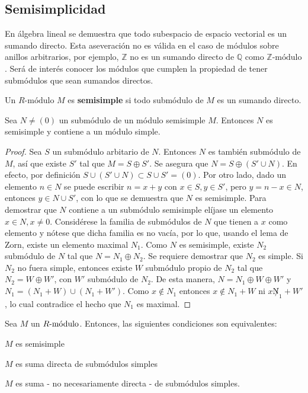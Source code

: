 \subsection{Semisimplicidad}
En álgebra lineal se demuestra que todo subespacio de espacio vectorial es un sumando directo. Esta aseveración no es válida en el caso de módulos sobre anillos arbitrarios, por ejemplo, $\mathds{Z}$ no es un sumando directo de $\mathds{Q}$ como $\mathds{Z}\mbox{-módulo}$. Será de interés conocer los módulos que cumplen la propiedad de tener submódulos que sean sumandos directos. 
\begin{definicion}
Un $R\mbox{-módulo}$ $M$ es \textbf{semisimple} si todo submódulo de $M$ es un sumando directo. 
\end{definicion}  
\begin{proposicion}
Sea $N \neq (0)$ un submódulo de un módulo semisimple $M$. Entonces $N$ es semisimple y contiene a un módulo simple.
\end{proposicion}
\begin{proof}
Sea $S$ un submódulo arbitario de $N$. Entonces $N$ es también submódulo de $M$, así que existe $S'$ tal que $M = S \oplus S'$. Se asegura que $N = S \oplus (S'\cup N)$. En efecto, por definición $S \cup (S'\cup N) \subset S\cup S' = (0)$. Por otro lado, dado un elemento $n \in N$ se puede escribir $n = x + y$ con $x \in S, y \in S'$, pero $y = n - x \in N$, entonces $y \in N \cup S'$, con lo que se demuestra que $N$ es semisimple. 
Para demostrar que $N$ contiene a un submódulo semisimple elíjase un elemento $x \in N, x \neq 0$. Considérese la familia de submódulos de $N$ que tienen a $x$ como elemento y nótese que dicha familia es no vacía, por lo que, usando el lema de Zorn, existe un elemento maximal $N_1$. Como $N$ es semisimple, existe $N_2$ submódulo de $N$ tal que $N = N_1 \oplus N_2$. Se requiere demostrar que $N_2$ es simple.
Si $N_2$ no fuera simple, entonces existe $W$ submódulo propio de $N_2$ tal que $N_2 = W \oplus W'$, con $W'$ submódulo de $N_2$. De esta manera, $N = N_1 \oplus W \oplus W'$ y $N_1 = (N_1 + W)\cup(N_1 + W')$. Como $x \notin N_1$ entonces $x \notin N_1 + W$ ni $x \not N_1 + W'$, lo cual contradice el hecho que $N_1$ es maximal.   
\end{proof}
\begin{teorema}\label{teo:caracSemi}
Sea $M$ un $\modulo{R}$. Entonces, las siguientes condiciones son equivalentes:
\begin{bulletList}
\item\label{item:ssimple1} $M$ es semisimple
\item\label{item:ssimple2} $M$ es suma directa de submódulos simples
\item\label{item:ssimple3} $M$ es suma - no necesariamente directa - de submódulos simples.
\end{bulletList}
\end{teorema}
